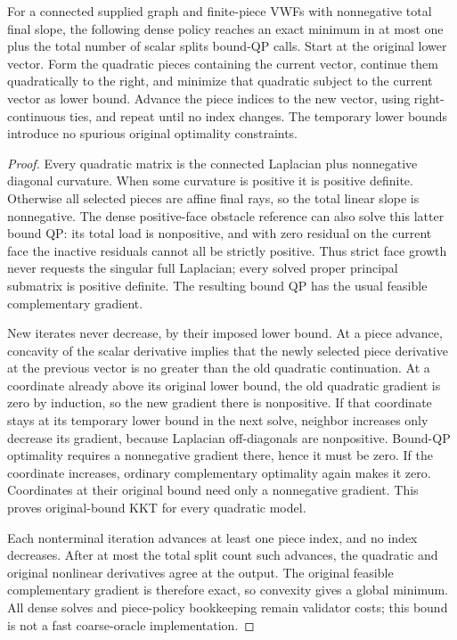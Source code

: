 \begin{lemma}
\label{lem:op3-vwf-forward-quadratic-policy}
For a connected supplied graph and finite-piece VWFs with nonnegative
total final slope, the following dense policy reaches an exact minimum
in at most one plus the total number of scalar splits bound-QP calls.
Start at the original lower vector. Form the quadratic pieces containing
the current vector, continue them quadratically to the right, and minimize
that quadratic subject to the current vector as lower bound. Advance the
piece indices to the new vector, using right-continuous ties, and repeat
until no index changes. The temporary lower bounds introduce no spurious
original optimality constraints.
\end{lemma}
\begin{proof}
Every quadratic matrix is the connected Laplacian plus nonnegative diagonal
curvature. When some curvature is positive it is positive definite.
Otherwise all selected pieces are affine final rays, so the total linear
slope is nonnegative. The dense positive-face obstacle reference can also
solve this latter bound QP: its total load is nonpositive, and with zero
residual on the current face the inactive residuals cannot all be strictly
positive. Thus strict face growth never requests the singular full
Laplacian; every solved proper principal submatrix is positive definite.
The resulting bound QP has the usual feasible complementary gradient.

New iterates never decrease, by their imposed lower bound. At a piece
advance, concavity of the scalar derivative implies that the newly selected
piece derivative at the previous vector is no greater than the old
quadratic continuation. At a coordinate already above its original lower
bound, the old quadratic gradient is zero by induction, so the new gradient
there is nonpositive. If that coordinate stays at its temporary lower
bound in the next solve, neighbor increases only decrease its gradient,
because Laplacian off-diagonals are nonpositive. Bound-QP optimality requires
a nonnegative gradient there, hence it must be zero. If the coordinate
increases, ordinary complementary optimality again makes it zero.
Coordinates at their original bound need only a nonnegative gradient.
This proves original-bound KKT for every quadratic model.

Each nonterminal iteration advances at least one piece index, and no index
decreases. After at most the total split count such advances, the quadratic
and original nonlinear derivatives agree at the output. The original
feasible complementary gradient is therefore exact, so convexity gives a
global minimum. All dense solves and piece-policy bookkeeping remain
validator costs; this bound is not a fast coarse-oracle implementation.
\end{proof}

